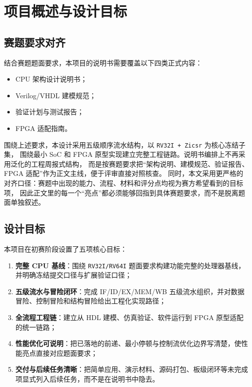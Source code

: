 \section{项目概述与设计目标}

\subsection{赛题要求对齐}

结合赛题题面要求，本项目的说明书需要覆盖以下四类正式内容：
\begin{itemize}
    \item CPU 架构设计说明书；
    \item Verilog/VHDL 建模规范；
    \item 验证计划与测试报告；
    \item FPGA 适配指南。
\end{itemize}

围绕上述要求，本设计采用五级顺序流水结构，以 \texttt{RV32I + Zicsr} 为核心冻结子集，
围绕最小 SoC 和 FPGA 原型实现建立完整工程链路。说明书编排上不再采用泛化的工程周报式结构，
而是按赛题要求把“架构说明、建模规范、验证报告、FPGA 适配”作为正文主线，便于评审直接对照核查。
同时，本文采用更严格的对齐口径：赛题中出现的能力、流程、材料和评分点均视为赛方希望看到的目标项，
因此正文里的每一个“亮点”都必须能够回指到具体赛题要求，而不是脱离题面单独叙述。

\subsection{设计目标}

本项目在初赛阶段设置了五项核心目标：
\begin{enumerate}
    \item \textbf{完整 CPU 基线}：围绕 \texttt{RV32I/RV64I} 题面要求构建功能完整的处理器基线，并明确冻结提交口径与扩展验证口径；
    \item \textbf{五级流水与冒险闭环}：完成 IF/ID/EX/MEM/WB 五级流水组织，并对数据冒险、控制冒险和结构冒险给出工程化实现路径；
    \item \textbf{全流程工程链}：建立从 HDL 建模、仿真验证、软件运行到 FPGA 原型适配的统一链路；
    \item \textbf{性能优化可说明}：把已落地的前递、最小停顿与控制流优化边界写清楚，使性能亮点直接对应题面要求；
    \item \textbf{交付与后续任务清晰}：把简单应用、演示材料、源码打包、板级闭环等未完成项显式列入后续任务，而不是在说明书中隐去。
\end{enumerate}

